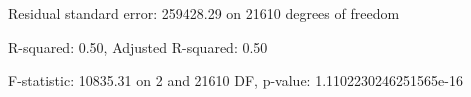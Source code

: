 Residual standard error: 259428.29 on 21610 degrees of freedom

R-squared: 0.50, Adjusted R-squared: 0.50

F-statistic: 10835.31 on 2 and 21610 DF, p-value: 1.1102230246251565e-16

